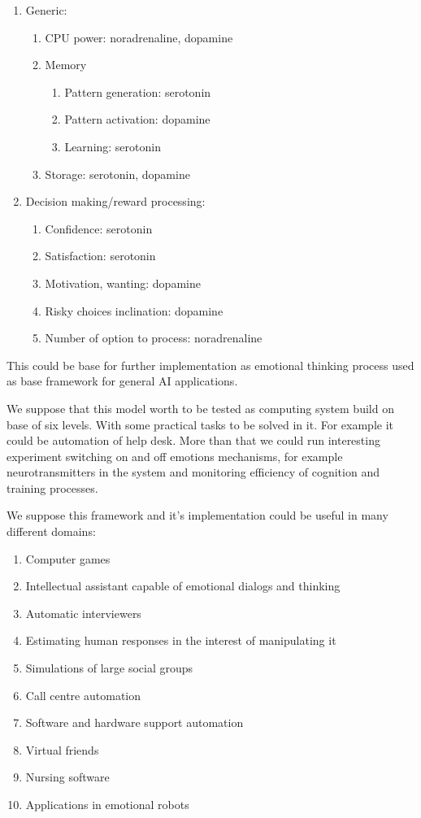\begin{enumerate}
\item  Generic:
\begin{enumerate}
\item  CPU power: noradrenaline, dopamine
\item  Memory
\begin{enumerate}
\item  Pattern generation: serotonin
\item  Pattern activation: dopamine
\item  Learning: serotonin
\end{enumerate}
\item  Storage: serotonin, dopamine
\end{enumerate}
\item  Decision making/reward processing:
\begin{enumerate}
\item  Confidence: serotonin
\item  Satisfaction: serotonin
\item  Motivation, wanting: dopamine
\item  Risky choices inclination: dopamine
\item  Number of option to process: noradrenaline
\end{enumerate}
\end{enumerate}

This could be base for further implementation as emotional thinking process used as base framework for general AI applications.

We suppose that this model worth to be tested as computing system build on base of six levels. With some practical tasks to be solved in it. For example it could be automation of help desk. More than that we could run interesting experiment switching on and off emotions mechanisms, for example neurotransmitters in the system and monitoring efficiency of cognition and training processes.

We suppose this framework and it's implementation could be useful in many different domains:

\begin{enumerate}
\item  Computer games
\item  Intellectual assistant capable of emotional dialogs and thinking
\item  Automatic interviewers
\item  Estimating human responses in the interest of manipulating it
\item  Simulations of large social groups
\item  Call centre automation
\item  Software and hardware support automation
\item  Virtual friends
\item  Nursing software
\item  Applications in emotional robots
\end{enumerate}